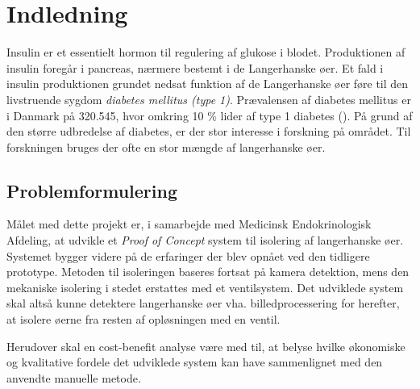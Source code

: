 \chapter{Indledning}
Insulin er et essentielt hormon til regulering af glukose i blodet. Produktionen af insulin foregår i pancreas, nærmere bestemt i de Langerhanske øer. Et fald i insulin produktionen grundet nedsat funktion af de Langerhanske øer føre til den livstruende sygdom \textit{diabetes mellitus (type 1)}. Prævalensen af diabetes mellitus er i Danmark på 320.545, hvor omkring 10 \% lider af type 1 diabetes (\cite{diabetes}). På grund af den større udbredelse af diabetes, er der stor interesse i forskning på området. Til forskningen bruges der ofte en stor mængde af langerhanske øer. 





\section{Problemformulering}

Målet med dette projekt er, i samarbejde med Medicinsk Endokrinologisk Afdeling, at udvikle et \textit{Proof of Concept} system til isolering af langerhanske øer. Systemet bygger videre på de erfaringer der blev opnået ved den tidligere prototype. Metoden til isoleringen baseres fortsat på kamera detektion, mens den mekaniske isolering i stedet erstattes med et ventilsystem. Det udviklede system skal altså kunne detektere langerhanske øer vha. billedprocessering for herefter, at isolere øerne fra resten af opløsningen med en ventil. 

Herudover skal en cost-benefit analyse være med til, at belyse hvilke økonomiske og kvalitative fordele det udviklede system kan have sammenlignet med den anvendte manuelle metode.

